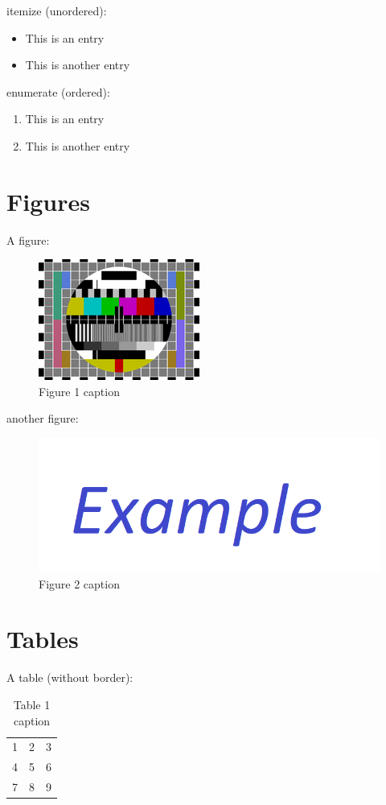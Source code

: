 itemize (unordered):
\begin{itemize}
    \item This is an entry
    \item This is another entry
\end{itemize}
enumerate (ordered):
\begin{enumerate}
    \item This is an entry
    \item This is another entry
\end{enumerate}

\section{Figures}

A figure:
\begin{figure}[H]
    \centering
    \includegraphics{figures/examples/example1.png}
    \caption{Figure 1 caption}\label{figure_example1}
\end{figure}

another figure:
\begin{figure}[H]
    \centering
    \includegraphics{figures/examples/example2.png}
    \caption{Figure 2 caption}\label{figure_example2}
\end{figure}

\section{Tables}

A table (without border):
\begin{table}[H]
    \centering
    \begin{tabular}{ l c r }
        1 & 2 & 3 \\
        4 & 5 & 6 \\
        7 & 8 & 9 \\
    \end{tabular}
    \caption{Table 1 caption}\label{tables_table1}
\end{table}

